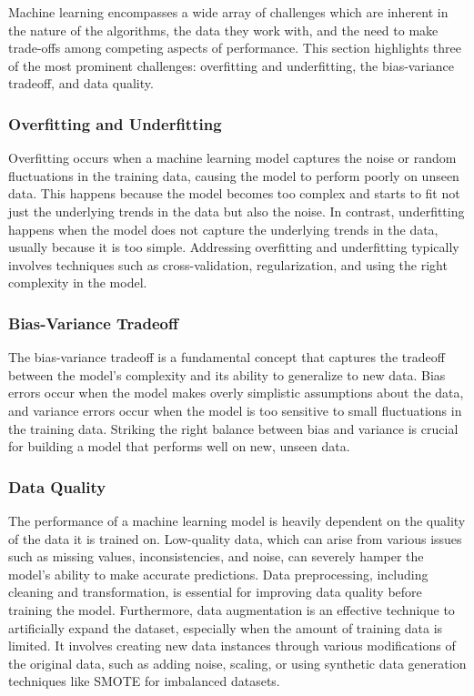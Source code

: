Machine learning encompasses a wide array of challenges which are inherent in the nature of the algorithms, the data they work with, and the need to make trade-offs among competing aspects of performance. This section highlights three of the most prominent challenges: overfitting and underfitting, the bias-variance tradeoff, and data quality.

\subsubsection{Overfitting and Underfitting}
Overfitting occurs when a machine learning model captures the noise or random fluctuations in the training data, causing the model to perform poorly on unseen data. This happens because the model becomes too complex and starts to fit not just the underlying trends in the data but also the noise. In contrast, underfitting happens when the model does not capture the underlying trends in the data, usually because it is too simple. Addressing overfitting and underfitting typically involves techniques such as cross-validation, regularization, and using the right complexity in the model.

\subsubsection{Bias-Variance Tradeoff}
The bias-variance tradeoff is a fundamental concept that captures the tradeoff between the model's complexity and its ability to generalize to new data. Bias errors occur when the model makes overly simplistic assumptions about the data, and variance errors occur when the model is too sensitive to small fluctuations in the training data. Striking the right balance between bias and variance is crucial for building a model that performs well on new, unseen data.

\subsubsection{Data Quality}
The performance of a machine learning model is heavily dependent on the quality of the data it is trained on. Low-quality data, which can arise from various issues such as missing values, inconsistencies, and noise, can severely hamper the model's ability to make accurate predictions. Data preprocessing, including cleaning and transformation, is essential for improving data quality before training the model. Furthermore, data augmentation is an effective technique to artificially expand the dataset, especially when the amount of training data is limited. It involves creating new data instances through various modifications of the original data, such as adding noise, scaling, or using synthetic data generation techniques like SMOTE for imbalanced datasets.

